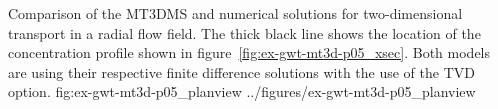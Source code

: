 \begin{StandardFigure}
	{Comparison of the MT3DMS and \mf numerical solutions for two-dimensional transport in a radial flow field.  The thick black line shows the location of the concentration profile shown in figure~\ref{fig:ex-gwt-mt3d-p05_xsec}. Both models are using their respective finite difference solutions with the use of the TVD option.} 
	{fig:ex-gwt-mt3d-p05_planview}
	{../figures/ex-gwt-mt3d-p05_planview}
\end{StandardFigure}
